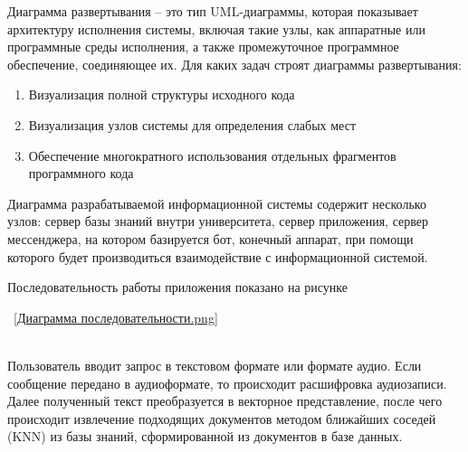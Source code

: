 

Диаграмма развертывания – это тип UML-диаграммы, которая показывает архитектуру
исполнения системы, включая такие узлы, как аппаратные или программные среды
исполнения, а также промежуточное программное обеспечение, соединяющее их. 
Для каких задач строят диаграммы развертывания:

\begin{enumerate}
    \item Визуализация полной структуры исходного кода
    \item Визуализация узлов системы для определения слабых мест
    \item Обеспечение многократного использования отдельных фрагментов
        программного кода
\end{enumerate}

Диаграмма разрабатываемой информационной системы содержит несколько узлов: 
сервер базы знаний внутри университета, сервер приложения, сервер мессенджера,
на котором базируется бот, конечный аппарат, при помощи которого будет 
производиться взаимодействие с информационной системой.


%
%
%
%

Последовательность работы приложения показано на рисунке

~\ref{Диаграмма последовательности.png}

\\

Пользователь вводит запрос в текстовом формате или формате аудио. Если
сообщение передано в аудиоформате, то происходит расшифровка аудиозаписи.
Далее полученный текст преобразуется в векторное представление, после чего
происходит извлечение подходящих документов методом ближайших соседей (KNN)
из базы знаний, сформированной из документов в базе данных.


